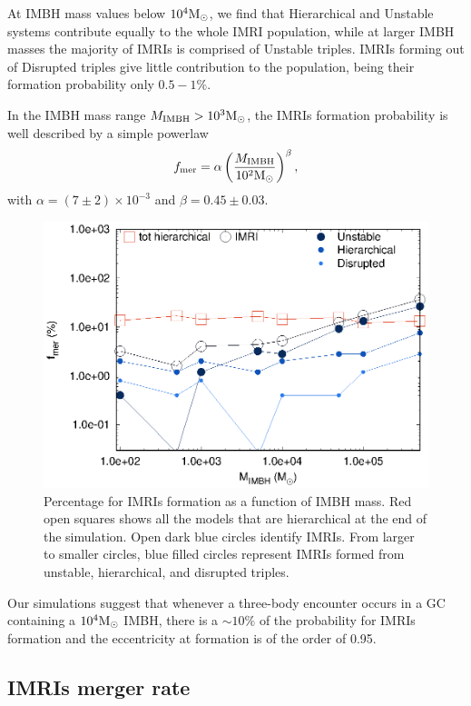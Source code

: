 \documentclass[twocolumn]{aastex62}
\newcommand{\Ms}{{\rm M}_\odot}
\newcommand{\ibh}{{\rm IMBH}}
\begin{document}
At IMBH mass values below $10^4\Ms$, we find that Hierarchical and Unstable systems contribute equally to the whole IMRI population, while at larger IMBH masses the majority of IMRIs is comprised of Unstable triples. IMRIs forming out of Disrupted triples give little contribution to the population, being their formation probability only $0.5-1\%$.

In the IMBH mass range $M_\ibh>10^3\Ms$, the IMRIs formation probability is well described by a simple powerlaw
\begin{equation}
f_{\rm mer} = \alpha \left(\frac{M_\ibh}{10^2\Ms}\right)^\beta,
\label{fmerg}
\end{equation}  
with $\alpha = (7\pm2)\times 10^{-3}$ and $\beta = 0.45\pm0.03$. 

\begin{figure}
    \centering
    \includegraphics[width=\columnwidth]{mergers.eps}
    \caption{Percentage for IMRIs formation as a function of IMBH mass. Red open squares shows all the models that are hierarchical at the end of the simulation. Open dark blue circles identify IMRIs. From larger to smaller circles, blue filled circles represent IMRIs formed from unstable, hierarchical, and disrupted triples.}
    \label{fig:f5}
\end{figure}

Our simulations suggest that whenever a three-body encounter occurs in a GC containing a $10^4\Ms$ IMBH, there is a $\sim 10\%$ of the probability for IMRIs formation and the eccentricity at formation is of the order of 0.95. 

\subsection{IMRIs merger rate}
\end{document}
